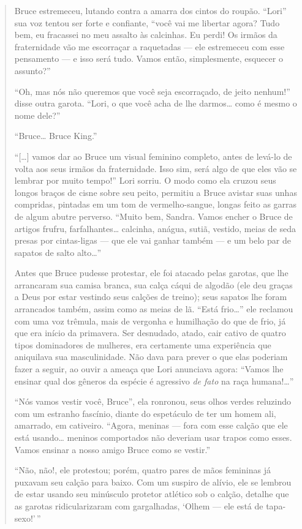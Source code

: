 \begin{quote}
Bruce estremeceu, lutando contra a amarra dos cintos do roupão.
``Lori'' sua voz tentou ser forte e
confiante, ``você vai me libertar agora? Tudo bem, eu
fracassei no meu assalto às calcinhas. Eu perdi! Os irmãos da
fraternidade vão me escorraçar a raquetadas --- ele estremeceu com
esse pensamento --- e isso será tudo. Vamos então, simplesmente,
esquecer o assunto?''

``Oh, mas nós não queremos que você seja escorraçado,
de jeito nenhum!'' disse outra garota.
``Lori, o que você acha de lhe darmos\ldots{} como é mesmo o
nome dele?''

``Bruce\ldots{} Bruce King.''

``[\ldots{}] vamos dar ao Bruce um visual feminino completo,
antes de levá-lo de volta aos seus irmãos da fraternidade. Isso sim,
será algo de que eles vão se lembrar por muito tempo!''
Lori sorriu. O modo como ela cruzou seus longos braços de cisne sobre seu
peito, permitiu a Bruce avistar suas unhas compridas, pintadas em um tom de
vermelho-sangue, longas feito as garras de algum abutre perverso.
``Muito bem, Sandra. Vamos encher o Bruce de artigos
frufru, farfalhantes\ldots{} calcinha, anágua, sutiã, vestido, meias de seda
presas por cintas-ligas --- que ele vai ganhar também --- e um belo
par de sapatos de salto alto\ldots{}''

Antes que Bruce pudesse protestar, ele foi atacado pelas garotas,
que lhe arrancaram sua camisa branca, sua calça cáqui de algodão (ele
deu graças a Deus por estar vestindo seus calções de treino); seus
sapatos lhe foram arrancados também, assim como as meias de lã.
``Está frio\ldots{}'' ele reclamou com uma voz
trêmula, mais de vergonha e humilhação do que de frio, já que era
início da primavera. Ser desnudado, atado, cair cativo de quatro tipos
dominadores de mulheres, era certamente uma experiência que aniquilava
sua masculinidade. Não dava para prever o que elas poderiam fazer a
seguir, ao ouvir a ameaça que Lori anunciava agora:
``Vamos lhe ensinar qual dos gêneros da espécie é
agressivo \textit{de fato} na raça humana!\ldots{}''

``Nós vamos vestir você, Bruce'', ela
ronronou, seus olhos verdes reluzindo com um estranho fascínio, diante
do espetáculo de ter um homem ali, amarrado, em cativeiro.
``Agora, meninas --- fora com esse calção que ele está
usando\ldots{} meninos comportados não deveriam usar trapos como esses.
Vamos ensinar a nosso amigo Bruce como se vestir.''

``Não, não!, ele protestou; porém, quatro pares de mãos
femininas já puxavam seu calção para baixo. Com um suspiro de alívio,
ele se lembrou de estar usando seu minúsculo protetor atlético sob o
calção, detalhe que as garotas ridicularizaram com gargalhadas,
`Olhem --- ele está de tapa-sexo!'\,''


\end{quote}
